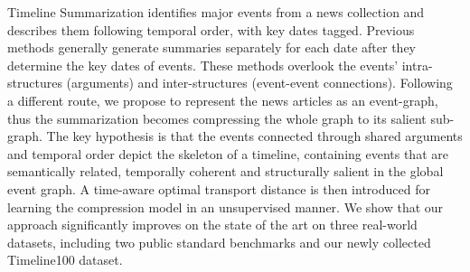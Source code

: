 Timeline Summarization identifies major events from a news collection and describes them following temporal order, with key dates tagged. Previous methods generally generate summaries separately for each date after they determine the key dates of events. These methods overlook the events' intra-structures (arguments) and inter-structures (event-event connections). Following a different route, we propose to represent the news articles as an event-graph, thus the summarization becomes compressing the whole graph to its salient sub-graph. The key hypothesis is that the events connected through shared arguments and temporal order depict the skeleton of a timeline, containing events that are semantically related, temporally coherent and structurally salient in the global event graph. A time-aware optimal transport distance is then introduced for learning the compression model in an unsupervised manner. We show that our approach significantly improves on the state of the art on three real-world datasets, including two public standard benchmarks and our newly collected Timeline100 dataset.
